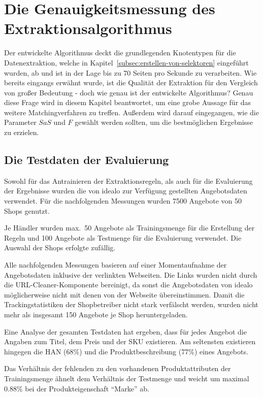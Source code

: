 \section{Die Genauigkeitsmessung des Extraktionsalgorithmus}
\label{sec:evaluierung}

Der entwickelte Algorithmus deckt die grundlegenden Knotentypen für die Datenextraktion, welche in
Kapitel~\ref{subsec:erstellen-von-selektoren} eingeführt wurden, ab und ist in der Lage bis zu 70 Seiten pro Sekunde
zu verarbeiten.
Wie bereits eingangs erwähnt wurde, ist die Qualität der Extraktion für den Vergleich von großer Bedeutung - doch wie
genau ist der entwickelte Algorithmus?
Genau diese Frage wird in diesem Kapitel beantwortet, um eine grobe Aussage für das weitere Matchingverfahren zu
treffen.
Außerdem wird darauf eingegangen, wie die Parameter $SaS$ und $F$ gewählt werden sollten, um die bestmöglichen
Ergebnisse zu erzielen.

\subsection{Die Testdaten der Evaluierung}
\label{subsec:testdaten}
Sowohl für das Antrainieren der Extraktionsregeln, als auch für die Evaluierung der Ergebnisse wurden die von idealo
zur Verfügung gestellten Angebotsdaten verwendet.
Für die nachfolgenden Messungen wurden 7500 Angebote von 50 Shops genutzt.

Je Händler wurden max.\ 50 Angebote als Trainingsmenge für die Erstellung der Regeln und 100 Angebote als Testmenge für
die Evaluierung verwendet.
Die Auswahl der Shops erfolgte zufällig.

Alle nachfolgenden Messungen basieren auf einer Momentaufnahme der Angebotsdaten inklusive der verlinkten Webseiten.
Die Links wurden nicht durch die URL-Cleaner-Komponente bereinigt, da sonst die Angebotsdaten von idealo
möglicherweise nicht mit denen von der Webseite übereinstimmen.
Damit die Trackingstatistiken der Shopbetreiber nicht stark verfälscht werden, wurden nicht mehr als insgesamt 150
Angebote je Shop heruntergeladen.

Eine Analyse der gesamten Testdaten hat ergeben, dass für jedes Angebot die Angaben zum Titel, dem Preis und der SKU
existieren.
Am seltensten existieren hingegen die HAN (68\%) und die Produktbeschreibung (77\%) eines Angebots.

Das Verhältnis der fehlenden zu den vorhandenen Produktattributen der Trainingsmenge ähnelt dem Verhältnis der
Testmenge und weicht um maximal 0.88\% bei der Produkteigenschaft ``Marke'' ab.

